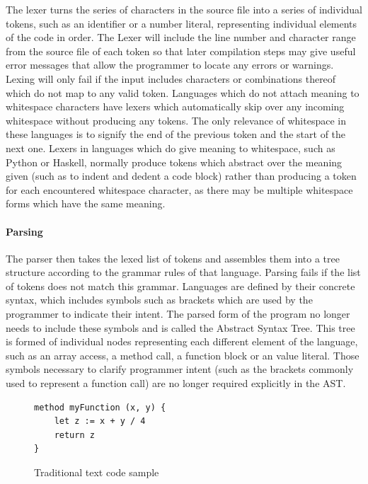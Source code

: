 The lexer turns the series of characters in the source file into a series of individual tokens, such as an identifier or a number literal, representing individual elements of the code in order. The Lexer will include the line number and character range from the source file of each token so that later compilation steps may give useful error messages that allow the programmer to locate any errors or warnings. Lexing will only fail if the input includes characters or combinations thereof which do not map to any valid token. Languages which do not attach meaning to whitespace characters have lexers which automatically skip over any incoming whitespace without producing any tokens. The only relevance of whitespace in these languages is to signify the end of the previous token and the start of the next one. Lexers in languages which do give meaning to whitespace, such as Python or Haskell, normally produce tokens which abstract over the meaning given (such as to indent and dedent a code block) rather than producing a token for each encountered whitespace character, as there may be multiple whitespace forms which have the same meaning.

\paragraph{Parsing}

The parser then takes the lexed list of tokens and assembles them into a tree structure according to the grammar rules of that language. Parsing fails if the list of tokens does not match this grammar. Languages are defined by their concrete syntax, which includes symbols such as brackets which are used by the programmer to indicate their intent. The parsed form of the program no longer needs to include these symbols and is called the Abstract Syntax Tree. This tree is formed of individual nodes representing each different element of the language, such as an array access, a method call, a function block or an value literal. Those symbols necessary to clarify programmer intent (such as the brackets commonly used to represent a function call) are no longer required explicitly in the AST.

\begin{figure}[H]
\centering
\begin{verbatim}
method myFunction (x, y) {
    let z := x + y / 4
    return z
}
\end{verbatim}
\caption{Traditional text code sample}
\label{fig:tradcode} %
\end{figure}

